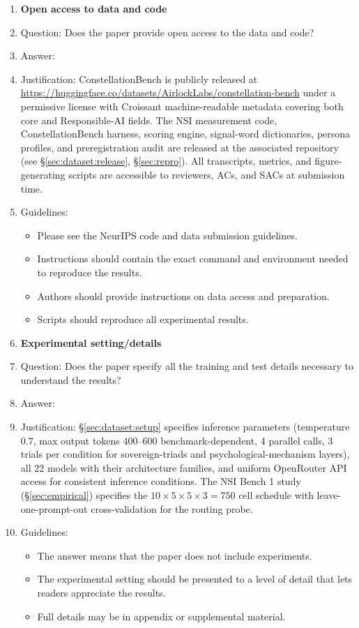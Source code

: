 \begin{enumerate}
\item {\bf Open access to data and code}
    \item[] Question: Does the paper provide open access to the data and code?
    \item[] Answer: \answerYes{}
    \item[] Justification: ConstellationBench is publicly released at \url{https://huggingface.co/datasets/AirlockLabs/constellation-bench} under a permissive license with Croissant machine-readable metadata covering both core and Responsible-AI fields. The NSI measurement code, ConstellationBench harness, scoring engine, signal-word dictionaries, persona profiles, and preregistration audit are released at the associated repository (see \S\ref{sec:dataset:release}, \S\ref{sec:repro}). All transcripts, metrics, and figure-generating scripts are accessible to reviewers, ACs, and SACs at submission time.
    \item[] Guidelines:
    \begin{itemize}
        \item Please see the NeurIPS code and data submission guidelines.
        \item Instructions should contain the exact command and environment needed to reproduce the results.
        \item Authors should provide instructions on data access and preparation.
        \item Scripts should reproduce all experimental results.
    \end{itemize}


\item {\bf Experimental setting/details}
    \item[] Question: Does the paper specify all the training and test details necessary to understand the results?
    \item[] Answer: \answerYes{}
    \item[] Justification: \S\ref{sec:dataset:setup} specifies inference parameters (temperature $0.7$, max output tokens $400$--$600$ benchmark-dependent, 4 parallel calls, 3 trials per condition for sovereign-triads and psychological-mechanism layers), all 22 models with their architecture families, and uniform OpenRouter API access for consistent inference conditions. The NSI Bench 1 study (\S\ref{sec:empirical}) specifies the $10 \times 5 \times 5 \times 3 = 750$ cell schedule with leave-one-prompt-out cross-validation for the routing probe.
    \item[] Guidelines:
    \begin{itemize}
        \item The answer \answerNA{} means that the paper does not include experiments.
        \item The experimental setting should be presented to a level of detail that lets readers appreciate the results.
        \item Full details may be in appendix or supplemental material.
    \end{itemize}


\end{enumerate}
